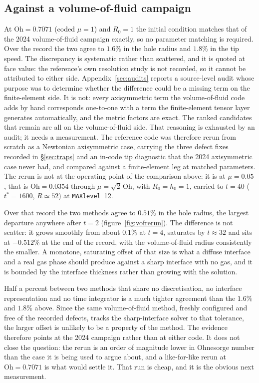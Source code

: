 \documentclass[11pt,a4paper]{article}
\newcommand{\Oh}{\mathrm{Oh}}
\begin{document}
\subsection{Against a volume-of-fluid campaign}
\label{sec:basilisk}

At $\Oh = 0.7071$ (coded $\mu = 1$) and $R_{0}=1$ the initial condition
matches that of the 2024 volume-of-fluid campaign exactly, so no parameter
matching is required.
Over the record the two agree to $1.6\%$ in the hole radius and $1.8\%$ in the
tip speed. The discrepancy is systematic rather than scattered, and it is quoted
at face value: the reference's own resolution study is not recorded, so it
cannot be attributed to either side. Appendix~\ref{sec:audits} reports a
source-level audit whose purpose was to determine whether the difference could
be a missing term on the finite-element side. It is not: every axisymmetric term
the volume-of-fluid code adds by hand corresponds one-to-one with a term the
finite-element tensor layer generates automatically, and the metric factors are
exact. The ranked candidates that remain are all on the volume-of-fluid side.
That reasoning is exhausted by an audit; it needs a measurement. The reference
code was therefore rerun from scratch as a Newtonian axisymmetric case, carrying
the three defect fixes recorded in \S\ref{sec:traps} and an in-code tip
diagnostic that the 2024 axisymmetric case never had, and compared against a
finite-element leg at matched parameters. The rerun is not at the operating
point of the comparison above: it is at $\mu=0.05$, that is $\Oh=0.0354$
through $\mu=\sqrt{2}\,\Oh$, with $R_{0}=h_{0}=1$, carried to $t=40$
($t^{*}=1600$, $R\simeq52$) at \texttt{MAXlevel}~12.

Over that record the two methods agree to $0.51\%$ in the hole radius, the
largest departure anywhere after $t=2$ (figure~\ref{fig:vofrerun}). The
difference is not scatter: it grows smoothly from about $0.1\%$ at $t=4$,
saturates by $t\approx32$ and sits at $-0.512\%$ at the end of the record, with
the volume-of-fluid radius consistently the smaller. A monotone, saturating
offset of that size is what a diffuse interface and a real gas phase should
produce against a sharp interface with no gas, and it is bounded by the
interface thickness rather than growing with the solution.

Half a percent between two methods that share no discretisation, no interface
representation and no time integrator is a much tighter agreement than the
$1.6\%$ and $1.8\%$ above. Since the same volume-of-fluid method, freshly
configured and free of the recorded defects, tracks the sharp-interface solver
to that tolerance, the larger offset is unlikely to be a property of the method.
The evidence therefore points at the 2024 campaign rather than at either code.
It does not close the question: the rerun is an order of magnitude lower in
Ohnesorge number than the case it is being used to argue about, and a
like-for-like rerun at $\Oh=0.7071$ is what would settle it. That run is
cheap, and it is the obvious next measurement.
\end{document}
